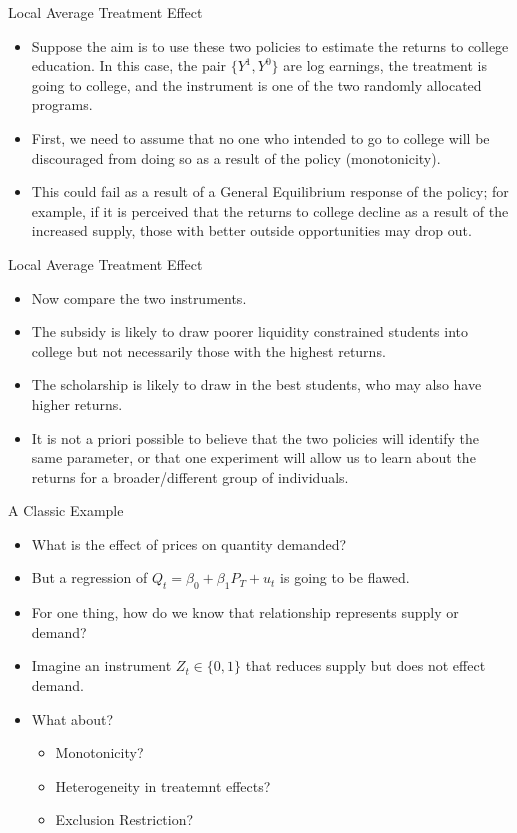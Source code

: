 \documentclass[xcolor=pdftex,dvipsnames,table,mathserif,aspectratio=169]{beamer}
\begin{document}
\begin{frame}{Local Average Treatment Effect}
\begin{itemize}
\item Suppose the aim is to use these two policies to estimate the returns to college education. In this case, the pair $\{Y^1, Y^0\}$ are log earnings, the treatment is going to college, and the instrument is one of the two randomly allocated programs.
\item First, we need to assume that no one who intended to go to college will be discouraged from doing so as a result of the policy (monotonicity).
\item This could fail as a result of a General Equilibrium response of the policy; for example, if it is perceived that the returns to college decline as a result of the increased supply, those with better outside opportunities may drop out.
\end{itemize}
\end{frame}

\begin{frame}{Local Average Treatment Effect}
\begin{itemize}
\item Now compare the two instruments.
\item The subsidy is likely to draw poorer liquidity constrained students into college but not necessarily those with the highest returns.
\item The scholarship is likely to draw in the best students, who may also have higher returns.
\item It is not a priori possible to believe that the two policies will identify the same parameter, or that one experiment will allow us to learn about the returns for a broader/different group of individuals.
\end{itemize}
\end{frame}

\begin{frame}{A Classic Example}
\begin{itemize}
\item What is the effect of prices on quantity demanded?
\item But a regression of $Q_t  = \beta_0 + \beta_1 P_T + u_t$ is going to be flawed.
\item For one thing, how do we know that relationship represents supply or demand?
\item Imagine an instrument $Z_t \in \{0,1\}$ that reduces supply but does not effect demand.
\item What about?
\begin{itemize}
\item Monotonicity?
\item Heterogeneity in treatemnt effects?
\item Exclusion Restriction?
\end{itemize}
\end{itemize}
\end{frame}
\end{document}
